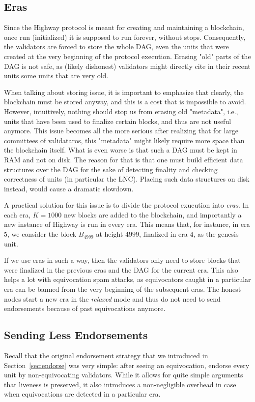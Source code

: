 \documentclass[12pt, fleqn]{article}
\begin{document}
\subsection{Eras}\label{sec:eras}
Since the Highway protocol is meant for creating and maintaining a blockchain, once run (initialized) it is supposed to run forever, without stops.
%
Consequently, the validators are forced to store the whole DAG, even the units that were created at the very beginning of the protocol execution.
%
Erasing "old" parts of the DAG is not safe, as (likely dishonest) validators might directly cite in their recent units some units that are very old.
%

When talking about storing issue, it is important to emphasize that clearly, the blockchain must be stored anyway, and this is a cost that is impossible to avoid.
%
However, intuitively, nothing should stop us from erasing old "metadata", i.e., units that have been used to finalize certain blocks, and thus are not useful anymore.
%
This issue becomes all the more serious after realizing that for large committees of validataros, this "metadata" might likely require more space than the blockchain itself.
%
What is even worse is that such a DAG must be kept in RAM and not on disk.
%
The reason for that is that one must build efficient data structures over the DAG for the sake of detecting finality and checking correctness of units (in particular the LNC).
%
Placing such data structures on disk instead, would cause a dramatic slowdown. 

A practical solution for this issue is to divide the protocol exucution into {\it eras}.
%
In each era, $K=1000$ new blocks are added to the blockchain, and importantly a new instance of Highway is run in every era.
%
This means that, for instance, in era $5$, we consider the block $B_{4999}$ at height $4999$, finalized in era $4$, as the genesis unit.

If we use eras in such a way, then the validators only need to store blocks that were finalized in the previous eras and the DAG for the current era.
%
This also helps a lot with equivocation spam attacks, as equivocators caught in a particular era can be banned from the very beginning of the subsequent eras.
%
The honest nodes start a new era in the {\it relaxed} mode and thus do not need to send endorsements because of past equivocations anymore.

\subsection{Sending Less Endorsements}
Recall that the original endorsement strategy that we introduced in Section~\ref{sec:endorse} was very simple: after seeing an equivocation, endorse every unit by non-equivocating validators.
%
While it allows for quite simple arguments that liveness is preserved, it also introduces a non-negligible overhead in case when equivocations are detected in a particular era.
%
\end{document}
